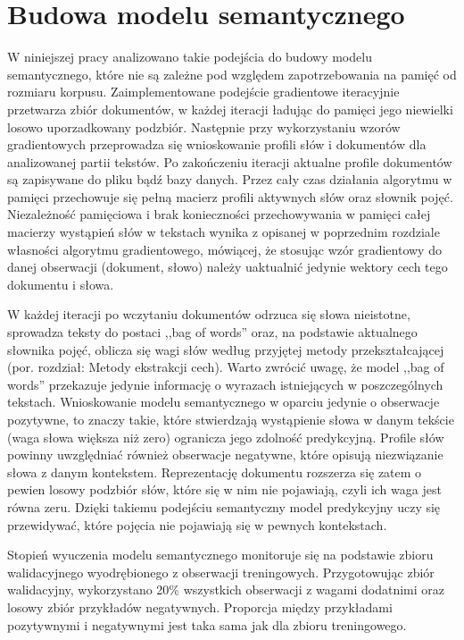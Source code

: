 \documentclass{pracamgr}
\begin{document}
\section{Budowa modelu semantycznego}
W niniejszej pracy analizowano takie podejścia do budowy modelu semantycznego, które nie są zależne pod względem zapotrzebowania na pamięć od rozmiaru korpusu. Zaimplementowane podejście gradientowe iteracyjnie przetwarza zbiór dokumentów, w każdej iteracji ładując do pamięci jego niewielki losowo uporzadkowany podzbiór. Następnie przy wykorzystaniu wzorów gradientowych przeprowadza się wnioskowanie profili słów i dokumentów dla analizowanej partii tekstów. Po zakończeniu iteracji aktualne profile dokumentów są zapisywane do pliku bądź bazy danych. Przez cały czas działania algorytmu w pamięci przechowuje się pełną macierz profili aktywnych słów oraz słownik pojęć. Niezależność pamięciowa i brak konieczności przechowywania w pamięci całej macierzy wystąpień słów w tekstach wynika z opisanej w poprzednim rozdziale własności algorytmu gradientowego, mówiącej, że stosując wzór gradientowy do danej obserwacji (dokument, słowo) należy uaktualnić jedynie wektory cech tego dokumentu i słowa.

W każdej iteracji po wczytaniu dokumentów odrzuca się słowa nieistotne, sprowadza teksty do postaci ,,bag of words'' oraz, na podstawie aktualnego słownika pojęć, oblicza się wagi słów według przyjętej metody przekształcającej (por. rozdział: Metody ekstrakcji cech). Warto zwrócić uwagę, że model ,,bag of words'' przekazuje jedynie informację o wyrazach istniejących w poszczególnych tekstach. Wnioskowanie modelu semantycznego w oparciu jedynie o obserwacje pozytywne, to znaczy takie, które stwierdzają wystąpienie słowa w danym tekście (waga słowa większa niż zero) ogranicza jego zdolność predykcyjną. Profile słów powinny uwzględniać również obserwacje negatywne, które opisują niezwiązanie słowa z danym kontekstem. Reprezentację dokumentu rozszerza się zatem o pewien losowy podzbiór słów, które się w nim nie pojawiają, czyli ich waga jest równa zeru. Dzięki takiemu podejściu semantyczny model predykcyjny uczy się przewidywać, które pojęcia nie pojawiają się w pewnych kontekstach.

Stopień wyuczenia modelu semantycznego monitoruje się na podstawie zbioru walidacyjnego wyodrębionego z obserwacji treningowych. Przygotowując zbiór walidacyjny, wykorzystano 20\% wszystkich obserwacji z wagami dodatnimi oraz losowy zbiór przykładów negatywnych. Proporcja między przykładami pozytywnymi i negatywnymi jest taka sama jak dla zbioru treningowego.
\end{document}
